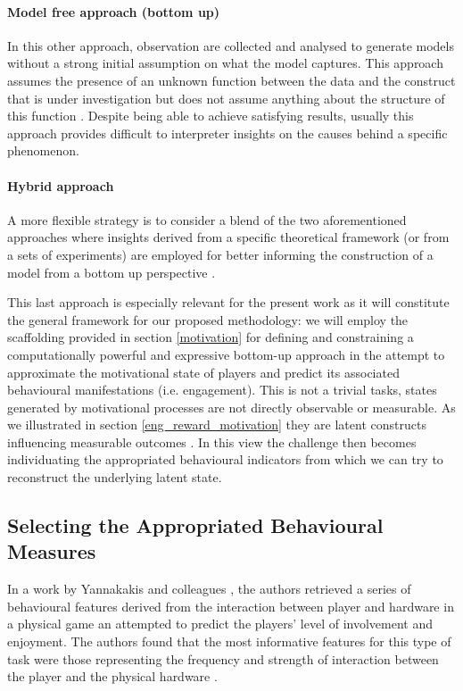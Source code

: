 \paragraph*{Model free approach (bottom up)} In this other approach, observation are collected and analysed to generate models without a strong initial assumption on what the model captures. This approach assumes the presence of an unknown function between the data and the construct that is under investigation but does not assume anything about the structure of this function \cite{yannakakis2013player}. Despite being able to achieve satisfying results, usually this approach provides difficult to interpreter insights on the causes behind a specific phenomenon.

\paragraph*{Hybrid approach} A more flexible strategy is to consider a blend of the two aforementioned approaches where insights derived from a specific theoretical framework (or from a sets of experiments) are employed for better informing the construction of a model from a bottom up perspective \cite{yannakakis2013player}. 

This last approach is especially relevant for the present work as it will constitute the general framework for our proposed methodology: we will employ the scaffolding provided in section \ref{motivation} for defining and constraining a computationally powerful and expressive bottom-up approach in the attempt to approximate the motivational state of players and predict its associated behavioural manifestations (i.e. engagement). This is not a trivial tasks, states generated by motivational processes are not directly observable or measurable. As we illustrated in section \ref{eng_reward_motivation} they are latent constructs influencing measurable outcomes \cite{yannakakis2007game, bauckhage2012players}. In this view the challenge then becomes individuating the appropriated behavioural indicators from which we can try to reconstruct the underlying latent state. 

\subsection{Selecting the Appropriated Behavioural Measures} In a work by Yannakakis and colleagues \cite{yannakakis2007game}, the authors retrieved a series of behavioural features derived from the interaction between player and hardware in a physical game an attempted to predict the players' level of involvement and enjoyment. The authors found that the most informative features for this type of task were those representing the frequency and strength of interaction between the player and the physical hardware \cite{yannakakis2007game}. 

